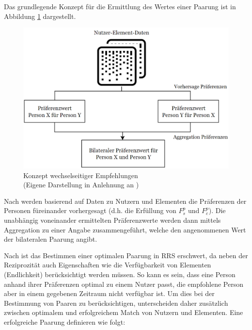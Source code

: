 Das grundlegende Konzept für die Ermittlung des Wertes einer Paarung ist in Abbildung \ref{fig:empfehlungssysteme:rrs:abb2} dargestellt.

\begin{figure}[H]
    \centering
	\includegraphics[width=1.0\textwidth]{gfx/concept-rrs.png}
	\caption[Konzept wechselseitiger Empfehlungen]{Konzept wechselseitiger Empfehlungen\\
    (Eigene Darstellung in Anlehnung an \cite[S. 2429]{palomares:inproceedings})}
	\label{fig:empfehlungssysteme:rrs:abb2}
\end{figure}

Nach \textcite[S. 2429]{palomares:inproceedings} werden basierend auf Daten zu Nutzern und Elementen die Präferenzen der Personen füreinander vorhergesagt (d.h. die Erfüllung von $F_{s}^{p}$ und $F_{c}^{p}$).
Die unabhängig voneinander ermittelten Präferenzwerte werden dann mittels Aggregation zu einer Angabe zusammengeführt, welche den angenommenen Wert der bilateralen Paarung angibt.

Nach \textcite[S. 36]{li:inproceedings} ist das Bestimmen einer optimalen Paarung in \ac{RRS} erschwert, da neben der Reziprozität auch Eigenschaften wie die Verfügbarkeit von Elementen (Endlichkeit) berücksichtigt werden müssen.
So kann es sein, dass eine Person anhand ihrer Präferenzen optimal zu einem Nutzer passt, die empfohlene Person aber in einem gegebenen Zeitraum nicht verfügbar ist.
Um dies bei der Bestimmung von Paaren zu berücksichtigen, unterscheiden \textcite[S. 37]{li:inproceedings} daher zusätzlich zwischen optimalem und erfolgreichem Match von Nutzern und Elementen.
Eine erfolgreiche Paarung definieren \textcite[S. 37]{li:inproceedings} wie folgt:

